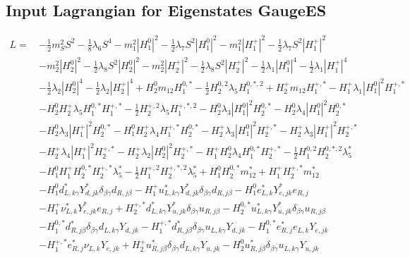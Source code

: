 \subsection{Input Lagrangian for Eigenstates GaugeES} 
\begin{align} 
L = \, & -\frac{1}{2} m_S^2 S^{2} -\frac{1}{8} \lambda_6 S^{4} - m^2_1 |H_1^0|^2 -\frac{1}{2} \lambda_7 S^{2} |H_1^0|^2 - m^2_1 |H_1^+|^2 -\frac{1}{2} \lambda_7 S^{2} |H_1^+|^2 \nonumber \\ 
 &- m^2_2 |H_2^0|^2 -\frac{1}{2} \lambda_8 S^{2} |H_2^0|^2 - m^2_2 |H_2^+|^2 -\frac{1}{2} \lambda_8 S^{2} |H_2^+|^2 -\frac{1}{2} \lambda_1 |H_1^0|^4 -\frac{1}{2} \lambda_1 |H_1^+|^4 \nonumber \\ 
 &-\frac{1}{2} \lambda_2 |H_2^0|^4 -\frac{1}{2} \lambda_2 |H_2^+|^4 +H_2^0 m_{12} H_1^{0,*} -\frac{1}{2} H_{2}^{0,2} \lambda_5 H_{1}^{0,*,2} +H_2^+ m_{12} H_1^{+,*} - H_1^+ \lambda_1 |H_1^0|^2 H_1^{+,*} \nonumber \\ 
 &- H_2^0 H_2^+ \lambda_5 H_1^{0,*} H_1^{+,*} -\frac{1}{2} H_{2}^{+,2} \lambda_5 H_{1}^{+,*,2} - H_2^0 \lambda_3 |H_1^0|^2 H_2^{0,*} - H_2^0 \lambda_4 |H_1^0|^2 H_2^{0,*} \nonumber \\ 
 &- H_2^0 \lambda_3 |H_1^+|^2 H_2^{0,*} - H_1^0 H_2^+ \lambda_4 H_1^{+,*} H_2^{0,*} - H_2^+ \lambda_3 |H_1^0|^2 H_2^{+,*} - H_2^+ \lambda_3 |H_1^+|^2 H_2^{+,*} \nonumber \\ 
 &- H_2^+ \lambda_4 |H_1^+|^2 H_2^{+,*} - H_2^+ \lambda_2 |H_2^0|^2 H_2^{+,*} - H_1^+ H_2^0 \lambda_4 H_1^{0,*} H_2^{+,*} -\frac{1}{2} H_{1}^{0,2} H_{2}^{0,*,2} \lambda_5^* \nonumber \\ 
 &- H_1^0 H_1^+ H_2^{0,*} H_2^{+,*} \lambda_5^* -\frac{1}{2} H_{1}^{+,2} H_{2}^{+,*,2} \lambda_5^* +H_1^0 H_2^{0,*} m_{12}^* +H_1^+ H_2^{+,*} m_{12}^* \nonumber \\ 
 &- H_1^0 d^*_{L,{k \gamma}} Y^*_{d,{j k}} \delta_{\beta \gamma} d_{R,{j \beta}} - H_1^+ u^*_{L,{k \gamma}} Y^*_{d,{j k}} \delta_{\beta \gamma} d_{R,{j \beta}} - H_1^0 e^*_{L,{k}} Y^*_{e,{j k}} e_{R,{j}} \nonumber \\ 
 &- H_1^+ \nu^*_{L,{k}} Y^*_{e,{j k}} e_{R,{j}} +H_2^{+,*} d^*_{L,{k \gamma}} Y^*_{u,{j k}} \delta_{\beta \gamma} u_{R,{j \beta}} - H_2^{0,*} u^*_{L,{k \gamma}} Y^*_{u,{j k}} \delta_{\beta \gamma} u_{R,{j \beta}} \nonumber \\ 
 &- H_1^{0,*} d^*_{R,{j \beta}} \delta_{\beta \gamma} d_{L,{k \gamma}} Y_{d,{j k}} - H_1^{+,*} d^*_{R,{j \beta}} \delta_{\beta \gamma} u_{L,{k \gamma}} Y_{d,{j k}} - H_1^{0,*} e^*_{R,{j}} e_{L,{k}} Y_{e,{j k}} \nonumber \\ 
 &- H_1^{+,*} e^*_{R,{j}} \nu_{L,{k}} Y_{e,{j k}} +H_2^+ u^*_{R,{j \beta}} \delta_{\beta \gamma} d_{L,{k \gamma}} Y_{u,{j k}} - H_2^0 u^*_{R,{j \beta}} \delta_{\beta \gamma} u_{L,{k \gamma}} Y_{u,{j k}} 
\end{align} 
